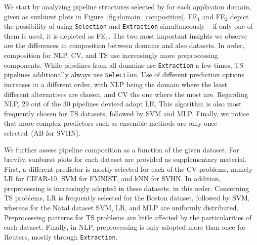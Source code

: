 We start by analyzing pipeline structures selected by \irace for each applicaton domain, given as sunburst plots in Figure~\ref{fig:domain_composition}. FE$_1$ and FE$_2$ depict the possibility of using \texttt{\small Selection} and \texttt{\small Extraction} simultaneously -- if only one of them is used, it is depicted as FE$_1$. 
The two most important insights we observe are the differences in composition between domains and also datasets. 
In order, composition for NLP, CV, and TS use increasingly more preprocessing components. While pipelines from all domains use \texttt{\small Extraction} a few times, TS pipelines additionally always use \texttt{\small Selection}. Use of different prediction options increases in a different order, with NLP being the domain where the least different alternatives are chosen, and CV the one where the most are. Regarding NLP, 29 out of the 30 pipelines devised adopt LR. This algorithm is also most frequently chosen for TS datasets, followed by SVM and MLP. Finally, we notice that more complex predictors such as ensemble methods are only once selected~(AB for SVHN).

We further assess pipeline composition as a function of the given dataset. For brevity, sunburst plots for each dataset are provided as supplementary material. First, a different predictor is mostly selected for each of the CV problems, namely LR for CIFAR-10, SVM for FMNIST, and kNN for SVHN. In addition, preprocessing is increasingly adopted in these datasets, in this order. Concerning TS problems, LR is frequently selected for the Boston dataset, followed by SVM, whereas for the Natal dataset SVM, LR, and MLP are uniformly distributed. Preprocessing patterns for TS problems are little affected by the particularities of each dataset. Finally, in NLP, preprocessing is only adopted more than once for Reuters, mostly through \texttt{\small Extraction}.

